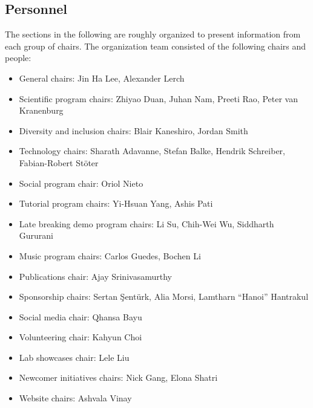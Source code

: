 \documentclass[%
10pt,								%
titlepage,						%
]
{scrartcl}
\begin{document}
    \subsection{Personnel}
        The sections in the following are roughly organized to present information from each group of chairs. The organization team consisted of the following chairs and people:

        \begin{itemize}
            \item   General chairs: Jin Ha Lee, Alexander Lerch
            \item   Scientific program chairs: Zhiyao Duan, Juhan Nam, Preeti Rao, Peter van Kranenburg
            \item   Diversity and inclusion chairs: Blair Kaneshiro, Jordan Smith
            \item   Technology chairs: Sharath Adavanne, Stefan Balke, Hendrik Schreiber, Fabian-Robert St\"oter
            \item   Social program chair: Oriol Nieto
            \item   Tutorial program chairs: Yi-Hsuan Yang, Ashis Pati
            \item   Late breaking demo program chairs: Li Su, Chih-Wei Wu, Siddharth Gururani
            \item   Music program chairs: Carlos Guedes, Bochen Li
            \item   Publications chair: Ajay Srinivasamurthy
            \item   Sponsorship chairs: Sertan \c{S}ent\"urk, Alia Morsi, Lamtharn ``Hanoi'' Hantrakul
            \item   Social media chair: Qhansa Bayu
            \item   Volunteering chair: Kahyun Choi
            \item   Lab showcases chair: Lele Liu
            \item   Newcomer initiatives chairs: Nick Gang, Elona Shatri
            \item   Website chairs: Ashvala Vinay
        \end{itemize}
\end{document}
